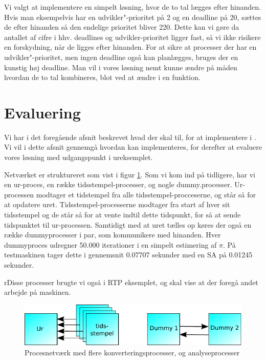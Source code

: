 Vi valgt at implementere en simpelt løsning, hvor  de to tal lægges efter hinanden. Hvis man eksempelvis har en udvikler"-prioritet på 2 og en deadline på 20, sættes de efter hinanden så den endelige prioritet bliver 220. Dette kan vi gøre da antallet af cifre i hhv. deadlines og udvikler-prioritet ligger fast, så vi ikke risikere en forskydning, når de ligges efter hinanden. For at sikre at processer der har en udvikler"-prioritet, men ingen deadline også kan planlægges, bruges der en kunstig høj deadline. Man vil i vores løsning nemt kunne ændre på måden hvordan de to tal kombineres, blot ved at ændre i en funktion. 




    
\section{Evaluering}
Vi har i det foregående afsnit beskrevet hvad der skal til, for at implementere \is i \pycsp. Vi vil i dette afsnit gennemgå hvordan \is kan implementeres, for derefter at evaluere vores løsning med udgangspunkt i ureksemplet.

Netværket er struktureret som vist i figur \cref{fig:watch_network}. Som vi kom ind på tidligere, har vi en ur-proces, en række tidsstempel-processer, og nogle dummy.processer. Ur-processen modtager et tidstempel fra alle  tidsstempel-procceserne, og står så for at  opdatere uret. Tidsstempel-processerne modtager fra start af hver sit tidsstempel og de står så for at vente indtil dette tidspunkt, for så at sende tidspunktet til ur-processen. Samtidigt med at uret tælles op køres der også en række dummyprocesser i par, som kommunikere med hinanden. Hver dummyproces udregner 50.000 iterationer i en simpelt estimering af $\pi$. På testmaskinen tager dette i gennemsnit 0.07707 sekunder med en SA på 0.01245 sekunder.

rDisse processer brugte vi også i RTP eksemplet, og skal vise at der foregå andet arbejde på maskinen. 
\begin{figure}
 \begin{center}
  \includegraphics[scale=1]{images/watch-network}
	\caption{Procesnetværk med flere konverteringsprocesser, og analyseprocesser}
	\label{fig:watch_network}
\end{center}
\end{figure}


